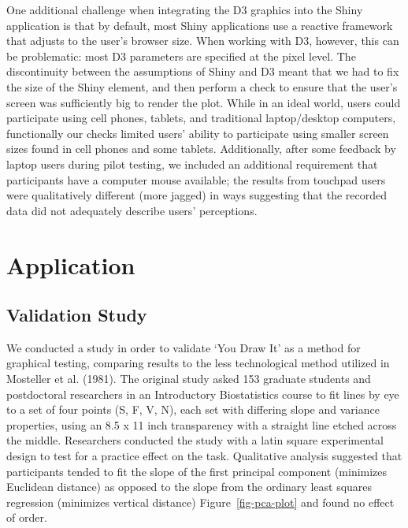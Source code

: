 \documentclass[
]{jds}
\begin{document}
One additional challenge when integrating the D3 graphics into the Shiny
application is that by default, most Shiny applications use a reactive
framework that adjusts to the user's browser size. When working with D3,
however, this can be problematic: most D3 parameters are specified at
the pixel level. The discontinuity between the assumptions of Shiny and
D3 meant that we had to fix the size of the Shiny element, and then
perform a check to ensure that the user's screen was sufficiently big to
render the plot. While in an ideal world, users could participate using
cell phones, tablets, and traditional laptop/desktop computers,
functionally our checks limited users' ability to participate using
smaller screen sizes found in cell phones and some tablets.
Additionally, after some feedback by laptop users during pilot testing,
we included an additional requirement that participants have a computer
mouse available; the results from touchpad users were qualitatively
different (more jagged) in ways suggesting that the recorded data did
not adequately describe users' perceptions.

\hypertarget{application}{%
\section{Application}\label{application}}

\hypertarget{validation-study}{%
\subsection{Validation Study}\label{validation-study}}

We conducted a study in order to validate `You Draw It' as a method for
graphical testing, comparing results to the less technological method
utilized in Mosteller et al. (1981). The original study asked 153
graduate students and postdoctoral researchers in an Introductory
Biostatistics course to fit lines by eye to a set of four points (S, F,
V, N), each set with differing slope and variance properties, using an
8.5 x 11 inch transparency with a straight line etched across the
middle. Researchers conducted the study with a latin square experimental
design to test for a practice effect on the task. Qualitative analysis
suggested that participants tended to fit the slope of the first
principal component (minimizes Euclidean distance) as opposed to the
slope from the ordinary least squares regression (minimizes vertical
distance) Figure~\ref{fig-pca-plot} and found no effect of order.
\end{document}
